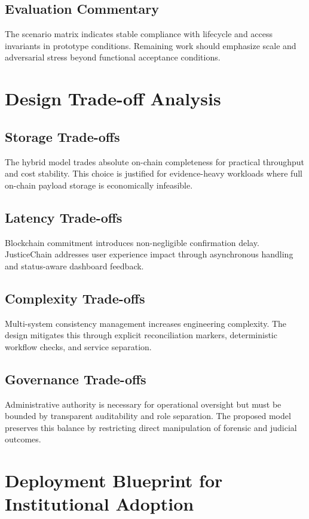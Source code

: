 \documentclass[conference]{IEEEtran}
\begin{document}
\subsection{Evaluation Commentary}
The scenario matrix indicates stable compliance with lifecycle and access invariants in prototype conditions. Remaining work should emphasize scale and adversarial stress beyond functional acceptance conditions.

\section{Design Trade-off Analysis}
\subsection{Storage Trade-offs}
The hybrid model trades absolute on-chain completeness for practical throughput and cost stability. This choice is justified for evidence-heavy workloads where full on-chain payload storage is economically infeasible.

\subsection{Latency Trade-offs}
Blockchain commitment introduces non-negligible confirmation delay. JusticeChain addresses user experience impact through asynchronous handling and status-aware dashboard feedback.

\subsection{Complexity Trade-offs}
Multi-system consistency management increases engineering complexity. The design mitigates this through explicit reconciliation markers, deterministic workflow checks, and service separation.

\subsection{Governance Trade-offs}
Administrative authority is necessary for operational oversight but must be bounded by transparent auditability and role separation. The proposed model preserves this balance by restricting direct manipulation of forensic and judicial outcomes.

\section{Deployment Blueprint for Institutional Adoption}
\end{document}
